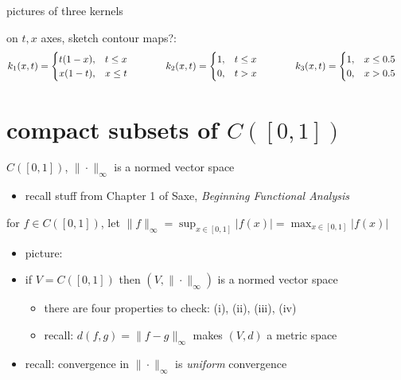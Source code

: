 \documentclass[10pt,
               svgnames,
               hyperref={colorlinks,
                         citecolor=DeepPink4,
                         linkcolor=FireBrick,
                         urlcolor=Maroon},
               usepdftitle=false]{beamer}
\newcommand{\ds}{\displaystyle}
\newcommand{\textbook}{Saxe, \emph{Beginning Functional Analysis}}
\begin{document}
\begin{frame}{pictures of three kernels}

\noindent on $t,x$ axes, sketch contour maps?:
{\scriptsize
\begin{align*}
k_1(x,t) &= \begin{cases} t (1 - x), & t \le x \\
	                         x (1 - t), & x \le t\end{cases} \hspace{10mm} &
k_2(x,t) &= \begin{cases} 1, & t \le x \\ 0, & t>x \end{cases} \hspace{10mm} &
k_3(x,t) &= \begin{cases} 1, & x\le 0.5 \\ 0, & x>0.5\end{cases}
\end{align*}
}

\vspace{50mm}
\end{frame}


\section{compact subsets of $C([0,1])$}

\begin{frame}{$C([0,1])$, $\|\cdot\|_\infty$ is a normed vector space}

\begin{itemize}
\item recall stuff from Chapter 1 of \textbook
\end{itemize}

\begin{definition}
for $f \in C([0,1])$, let \qquad $\ds \|f\|_\infty = \sup_{x\in[0,1]} |f(x)| = \max_{x\in[0,1]} |f(x)|$
\end{definition}

\begin{itemize}
\item picture:

\vspace{15mm}
\item if $V=C([0,1])$ then $(V,\|\cdot\|_\infty)$ is a normed vector space
    \begin{itemize}
    \item[$\circ$] there are four properties to check: (i), (ii), (iii), (iv)
    \item[$\circ$] recall: $d(f,g) = \|f-g\|_\infty$ makes $(V,d)$ a metric space
    \end{itemize}
\item recall: convergence in $\|\cdot\|_\infty$ is \emph{uniform} convergence
\end{itemize}
\end{frame}
\end{document}
